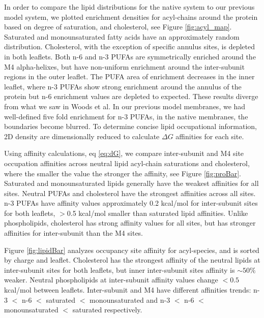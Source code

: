\documentclass[preprint,3p,9pt,times,onecolumn]{elsarticle}
\begin{document}
In order to compare the lipid distributions for the native system to our previous model system, we plotted enrichment densities for acyl-chains around the protein based on degree of saturation, and cholesterol, see Figure \ref{fig:acyl_map}. Saturated and monounsaturated fatty acids have an approximately random distribution. Cholesterol, with the exception of specific annulus sites, is depleted in both leaflets. Both n-6 and n-3 PUFAs are symmetrically enriched around the M4 alpha-helixes, but have non-uniform enrichment around the inter-subunit regions in the outer leaflet. The PUFA area of enrichment decreases in the inner leaflet, where n-3 PUFAs show strong enrichment around the annulus of the protein but n-6 enrichment values are depleted to expected. These results diverge from what we saw in Woods et al\cite{Woods2019}. In our previous model membranes, we had well-defined five fold enrichment for n-3 PUFAs, in the native membranes, the boundaries become blurred. To determine concise lipid occupational information, 2D density are dimensionally reduced to calculate $\Delta G$ affinities for each site.

Using affinity calculations, eq \ref{eq:dG}, we compare inter-subunit and M4 site occupation affinities across neutral lipid acyl-chain saturations and cholesterol, where the smaller the value the stronger the affinity, see Figure \ref{fig:proBar}. Saturated and monounsaturated lipids generally have the weakest affinities for all sites.  Neutral PUFAs and cholesterol have the strongest affinities across all sites. n-3 PUFAs have affinity values approximately 0.2 kcal/mol for inter-subunit sites for both leaflets, $>$0.5 kcal/mol smaller than saturated lipid affinities. Unlike phospholipids, cholesterol has strong affinity values for all sites, but has stronger affinities for inter-subunit  than the M4 sites.

Figure \ref{fig:lipidBar} analyzes occupancy site affinity for acyl-species, and is sorted by charge and leaflet. Cholesterol has the strongest affinity of the neutral lipids at inter-subunit sites for both leaflets, but inner inter-subunit sites affinity is $\sim 50 \%$ weaker. Neutral phospholipids at inter-subunit affinity values change $<0.5$ kcal/mol between leaflets.  Inter-subunit and M4 have different affinities trends: n-3 $<$ n-6 $<$ saturated $<$ monounsaturated and  n-3 $<$ n-6 $<$ monounsaturated $<$ saturated respectively. 

\end{document}
